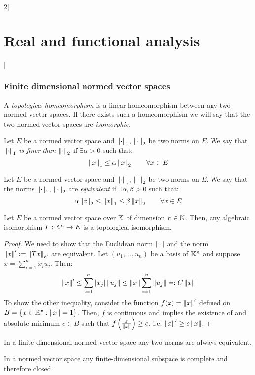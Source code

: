 \documentclass[../../../main_math.tex]{subfiles}
\begin{document}
\begin{multicols}{2}[\section{Real and functional analysis}]
  \subsubsection{Finite dimensional normed vector spaces}
  \begin{definition}
    A \emph{topological homeomorphism} is a linear homeomorphism between any two normed vector spaces. If there exists such a homeomorphism we will say that the two normed vector spaces are \emph{isomorphic}.
  \end{definition}
  \begin{definition}
    Let $E$ be a normed vector space and $\left\|\cdot\right\|_1$, $\left\|\cdot\right\|_2$ be two norms on $E$. We say that $\left\|\cdot\right\|_1$ \emph{is finer than} $\left\|\cdot\right\|_2$ if $\exists\alpha>0$ such that: $$\left\|x\right\|_1\leq\alpha\left\|x\right\|_2\qquad \forall x\in E$$
  \end{definition}
  \begin{definition}
    Let $E$ be a normed vector space and $\left\|\cdot\right\|_1$, $\left\|\cdot\right\|_2$ be two norms on $E$. We say that the norms $\left\|\cdot\right\|_1$, $\left\|\cdot\right\|_2$ are \emph{equivalent} if $\exists\alpha,\beta>0$ such that: $$\alpha\left\|x\right\|_2\leq \left\|x\right\|_1\leq\beta\left\|x\right\|_2\qquad \forall x\in E$$
  \end{definition}
  \begin{theorem}
    Let $E$ be a normed vector space over $\mathbb{K}$ of dimension $n\in\mathbb{N}$. Then, any algebraic isomorphism $T:\mathbb{K}^n\rightarrow E$ is a topological isomorphism.
  \end{theorem}
  \begin{proof}
    We need to show that the Euclidean norm $\left\|\cdot\right\|$ and the norm $\left\|x\right\|':=\left\|Tx\right\|_E$ are equivalent. Let $(u_1,\ldots,u_n)$ be a basis of $\mathbb{K}^n$ and suppose $x=\sum_{i=1}^n x_ju_j$. Then:
    $$\left\|x\right\|'\leq\sum_{i=1}^n \abs{x_j}\left\|u_j\right\|\leq\left\|x\right\|\sum_{i=1}^n \left\|u_j\right\|=:C\left\|x\right\|$$
    To show the other inequality, consider the function $f(x)=\left\|x\right\|'$ defined on $B=\{x\in \mathbb{K}^n:\left\|x\right\|=1\}$. Then, $f$ is continuous and  implies the existence of and absolute minimum $c\in B$ such that $f\left(\frac{x}{\left\|x\right\|}\right)\geq c$, i.e. $\left\|x\right\|'\geq c\left\|x\right\|$.
  \end{proof}
  \begin{corollary}
    In a finite-dimensional normed vector space any two norms are always equivalent.
  \end{corollary}
  \begin{corollary}
    In a normed vector space any finite-dimensional subspace is complete and therefore closed.

\end{corollary}
\end{multicols}
\end{document}
